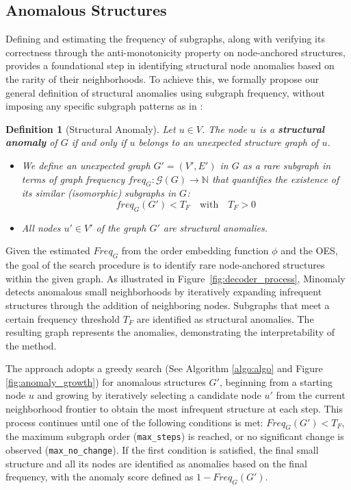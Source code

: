 \documentclass[pdflatex,sn-mathphys-num]{sn-jnl}%
\theoremstyle{thmstyleone}%
\theoremstyle{thmstyletwo}%
\theoremstyle{thmstylethree}%
\newtheorem{definition}{Definition}%
\begin{document}
\subsection{Anomalous Structures}\label{sec:anomaly_search}
Defining and estimating the frequency of subgraphs, along with verifying its correctness through the anti-monotonicity property on node-anchored structures, provides a foundational step in identifying structural node anomalies based on the rarity of their neighborhoods. To achieve this, we formally propose our general definition of structural anomalies using subgraph frequency, without imposing any specific subgraph patterns as in \cite{ying2024representation,rex2020neural}:

\begin{definition}[Structural Anomaly]
Let $u \in V$. The node $u$ is a \textbf{structural anomaly} of $G$ if and only if $u$ belongs to an unexpected structure graph of $u$.
\begin{itemize}
 \item We define an unexpected graph $G'=(V', E')$ in $G$ as a rare subgraph in terms of graph frequency $freq_G: \mathcal{G}(G) \to \mathbb{N}$ that quantifies the existence of its similar (isomorphic) subgraphs in $G$:
 \[
  freq_G(G') < T_F \quad \text{with} \quad T_F > 0
 \]
 \item All nodes $u' \in V'$ of the graph $G'$ are structural anomalies.
\end{itemize}
\end{definition}

Given the estimated $Freq_G$ from the order embedding function $\phi$ and the OES, the goal of the search procedure is to identify rare node-anchored structures within the given graph. As illustrated in Figure~\ref{fig:decoder_process}, Minomaly detects anomalous small neighborhoods by iteratively expanding infrequent structures through the addition of neighboring nodes. Subgraphs that meet a certain frequency threshold $T_F$ are identified as structural anomalies. The resulting graph represents the anomalies, demonstrating the interpretability of the method.

The approach adopts a greedy search (See Algorithm \ref{algo:algo} and Figure \ref{fig:anomaly_growth}) for anomalous structures $G'$, beginning from a starting node $u$ and growing by iteratively selecting a candidate node $u'$ from the current neighborhood frontier to obtain the most infrequent structure at each step. This process continues until one of the following conditions is met: $Freq_G(G') < T_F$, the maximum subgraph order (\texttt{max\_steps}) is reached, or no significant change is observed (\texttt{max\_no\_change}). If the first condition is satisfied, the final small structure and all its nodes are identified as anomalies based on the final frequency, with the anomaly score defined as $1 - Freq_G(G')$.
\end{document}
